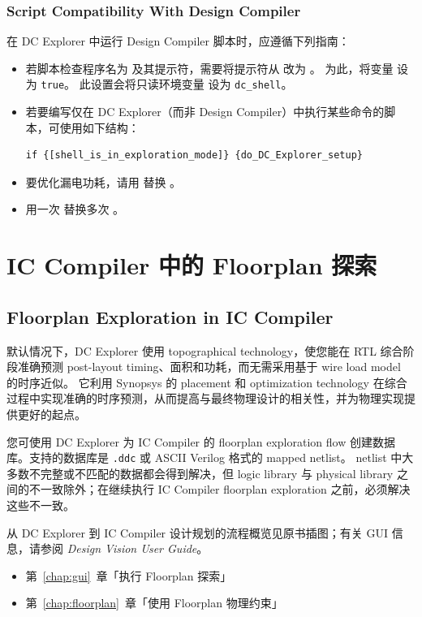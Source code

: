 \subsubsection*{Script Compatibility With Design Compiler}

在 DC Explorer 中运行 Design Compiler 脚本时，应遵循下列指南：
\begin{itemize}
  \item 若脚本检查程序名为  及其提示符，需要将提示符从  改为 。
        为此，将变量  设为 \texttt{true}。
        此设置会将只读环境变量  设为 \texttt{dc\_shell}。
  \item 若要编写仅在 DC Explorer（而非 Design Compiler）中执行某些命令的脚本，可使用如下结构：
\begin{lstlisting}
if {[shell_is_in_exploration_mode]} {do_DC_Explorer_setup}
\end{lstlisting}
  \item 要优化漏电功耗，请用  替换 。
  \item 用一次  替换多次 。
\end{itemize}

\section{IC Compiler 中的 Floorplan 探索}
\subsection*{Floorplan Exploration in IC Compiler}

默认情况下，DC Explorer 使用 topographical technology，使您能在 RTL 综合阶段准确预测 post-layout timing、面积和功耗，而无需采用基于 wire load model 的时序近似。
它利用 Synopsys 的 placement 和 optimization technology 在综合过程中实现准确的时序预测，从而提高与最终物理设计的相关性，并为物理实现提供更好的起点。

您可使用 DC Explorer 为 IC Compiler 的 floorplan exploration flow 创建数据库。支持的数据库是 \texttt{.ddc} 或 ASCII Verilog 格式的 mapped netlist。
netlist 中大多数不完整或不匹配的数据都会得到解决，但 logic library 与 physical library 之间的不一致除外；在继续执行 IC Compiler floorplan exploration 之前，必须解决这些不一致。

从 DC Explorer 到 IC Compiler 设计规划的流程概览见原书插图；有关 GUI 信息，请参阅 \textit{Design Vision User Guide}。

\begin{seeAlsoBox}
\begin{itemize}
  \item 第~\ref{chap:gui}~章「执行 Floorplan 探索」
  \item 第~\ref{chap:floorplan}~章「使用 Floorplan 物理约束」
\end{itemize}
\end{seeAlsoBox}
